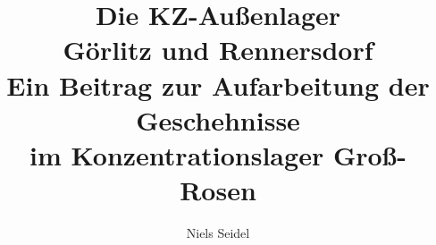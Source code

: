 \documentclass[a4paper,12pt,ngerman,
]{nisebook}
\begin{document}

\newpage ~\newpage




\newpage
\normalsize

\begin{titlepage}
	\title{Die KZ-Außenlager\\ Görlitz und Rennersdorf\vspace{10 pt}
	\\\large{Ein Beitrag zur Aufarbeitung der Geschehnisse\\ im Konzentrationslager Groß-Rosen}}
	\author{Niels Seidel}
  \maketitle
\end{titlepage}
\end{document}
